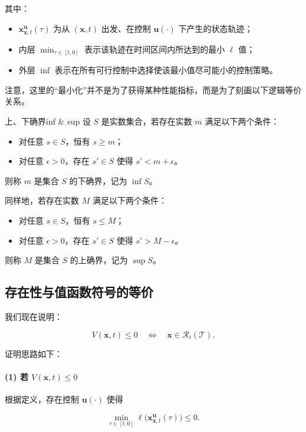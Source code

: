 \documentclass[11pt]{ctexrep}
\begin{document}
其中：
\begin{itemize}
    \item $\mathbf{x}^{\mathbf{u}}_{\mathbf{x},t}(\tau)$ 为从 $(\mathbf{x},t)$ 出发、在控制 $\mathbf{u}(\cdot)$ 下产生的状态轨迹；
    \item 内层 $\min_{\tau \in [t,0]}$ 表示该轨迹在时间区间内所达到的最小 $\ell$ 值；
    \item 外层 $\inf$ 表示在所有可行控制中选择使该最小值尽可能小的控制策略。
\end{itemize}

注意，这里的“最小化”并不是为了获得某种性能指标，而是为了刻画以下逻辑等价关系。

\begin{defn}{上、下确界}{inf & sup}
设 $S$ 是实数集合，若存在实数 $m$ 满足以下两个条件：
\begin{itemize}
    \item 对任意 $s \in S$，恒有 $s \ge m$；
    \item 对任意 $\epsilon > 0$，存在 $s' \in S$ 使得 $s' < m + \epsilon$。
\end{itemize}
则称 $m$ 是集合 $S$ 的下确界，记为 $\inf S$。

同样地，若存在实数 $M$ 满足以下两个条件：
\begin{itemize}
    \item 对任意 $s \in S$，恒有 $s \le M$；
    \item 对任意 $\epsilon > 0$，存在 $s' \in S$ 使得 $s' > M - \epsilon$。
\end{itemize}
则称 $M$ 是集合 $S$ 的上确界，记为 $\sup S$。
\end{defn}
\subsection{存在性与值函数符号的等价}

我们现在说明：

\[
V(\mathbf{x},t) \le 0
\quad \Longleftrightarrow \quad
\mathbf{x} \in \mathcal{R}_t(\mathcal{T}).
\]

证明思路如下：

\paragraph{(1) 若 $V(\mathbf{x},t) \le 0$}

根据定义，存在控制 $\mathbf{u}(\cdot)$ 使得

\[
\min_{\tau \in [t,0]} 
\ell\big(
\mathbf{x}^{\mathbf{u}}_{\mathbf{x},t}(\tau)
\big)
\le 0.
\]
\end{document}
